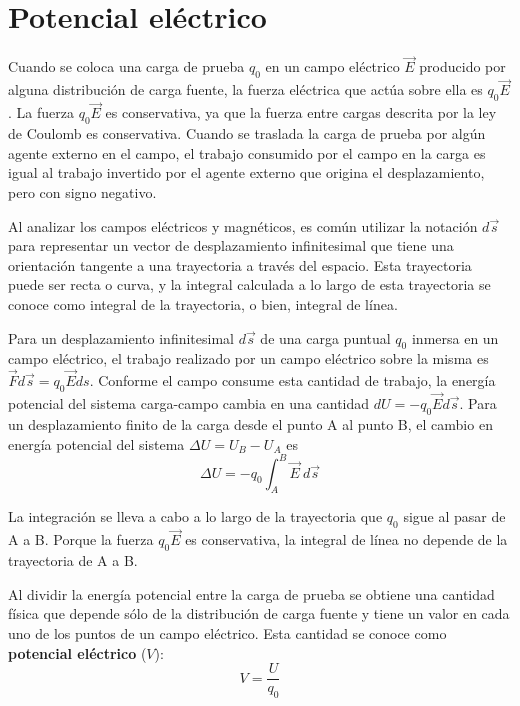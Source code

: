 \section{Potencial eléctrico}
  \PN Cuando se coloca una carga de prueba $q_{0}$ en un campo eléctrico $\vec{E}$ producido por alguna distribución de
  carga fuente, la fuerza eléctrica que actúa sobre ella es $q_{0} \vec{E}$. La fuerza $q_{0}\vec{E}$ es conservativa,
  ya que la fuerza entre cargas descrita por la ley de Coulomb es conservativa. Cuando se traslada la carga de prueba
  por algún agente externo en el campo, el trabajo consumido por el campo en la carga es igual al trabajo invertido por
  el agente externo que origina el desplazamiento, pero con signo negativo.

  \VS
  \PN Al analizar los campos eléctricos y magnéticos, es común utilizar la notación $d\vec{s}$ para representar un
  vector de desplazamiento infinitesimal que tiene una orientación tangente a una trayectoria a través del espacio. Esta
  trayectoria puede ser recta o curva, y la integral calculada a lo largo de esta trayectoria se conoce como integral de
  la trayectoria, o bien, integral de línea.

  \VS
  \PN Para un desplazamiento infinitesimal $d\vec{s}$ de una carga puntual $q_{0}$ inmersa en un campo eléctrico, el
  trabajo realizado por un campo eléctrico sobre la misma es $\vec{F} d\vec{s} = q_{0} \vec{E} ds$. Conforme el campo
  consume esta cantidad de trabajo, la energía potencial del sistema carga-campo cambia en una cantidad $dU = -q_{0}
  \vec{E} d\vec{s}$. Para un desplazamiento finito de la carga desde el punto A al punto B, el cambio en energía
  potencial del sistema $\Delta U = U_{B} - U_{A}$ es
  \begin{equation*}
    \Delta U = -q_{0} \int_{A}^{B} \vec{E} \ d\vec{s}
  \end{equation*}

  \PN La integración se lleva a cabo a lo largo de la trayectoria que $q_{0}$ sigue al pasar de A a B. Porque la fuerza
  $q_{0}\vec{E}$ es conservativa, la integral de línea no depende de la trayectoria de A a B.

  \VS
  \PN Al dividir la energía potencial entre la carga de prueba se obtiene una cantidad física que depende sólo de la
  distribución de carga fuente y tiene un valor en cada uno de los puntos de un campo eléctrico. Esta cantidad se conoce
  como \textbf{potencial eléctrico} ($V$):
  \begin{equation*}
    V = \frac{U}{q_{0}}
  \end{equation*}

